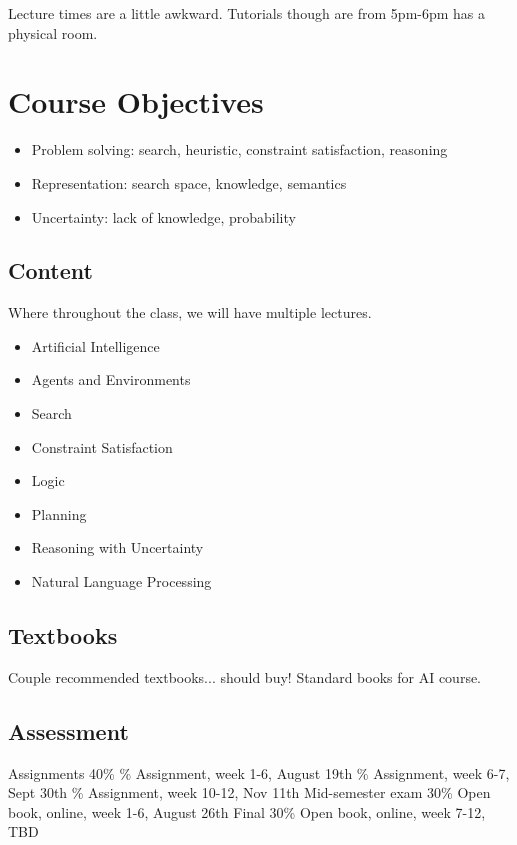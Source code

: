 \documentclass{article}
\begin{document}
Lecture times are a little awkward. Tutorials though are from 5pm-6pm has a physical room.

\section{Course Objectives}
\begin{itemize}
				\item Problem solving: search, heuristic, constraint satisfaction, reasoning
				\item Representation: search space, knowledge, semantics 
				\item Uncertainty: lack of knowledge, probability
\end{itemize}

\subsection{Content}
Where throughout the class, we will have multiple lectures.
\begin{itemize}
				\item Artificial Intelligence
				\item Agents and Environments
				\item Search
				\item Constraint Satisfaction
				\item Logic
				\item Planning
				\item Reasoning with Uncertainty
				\item Natural Language Processing
\end{itemize}

\subsection*{Textbooks}
Couple recommended textbooks... should buy! Standard books for AI course.

\subsection*{Assessment}
\begin{outline}
				\1 Assignments 40\%
								\% Assignment, week 1-6, August 19th
								\% Assignment, week 6-7, Sept 30th
								\% Assignment, week 10-12, Nov 11th
				\1 Mid-semester exam 30\%
								\2 Open book, online, week 1-6, August 26th
				\1 Final 30\%
								\2 Open book, online, week 7-12, TBD
\end{outline}
\end{document}
